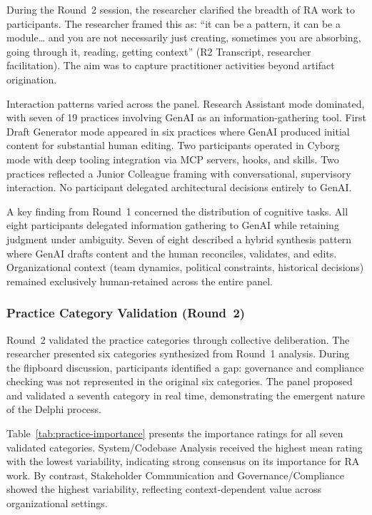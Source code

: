 During the Round~2 session, the researcher clarified the breadth of RA work to
participants. The researcher framed this as: ``it can be a pattern, it can be a
module\ldots{} and you are not necessarily just creating, sometimes you are
absorbing, going through it, reading, getting context'' (R2 Transcript,
researcher facilitation). The aim was to capture practitioner activities beyond artifact origination.

Interaction patterns varied across the panel. Research Assistant mode dominated,
with seven of 19 practices involving GenAI as an information-gathering tool.
First Draft Generator mode appeared in six practices where GenAI produced initial
content for substantial human editing. Two participants operated in Cyborg mode
with deep tooling integration via MCP servers, hooks, and skills. Two practices
reflected a Junior Colleague framing with conversational, supervisory
interaction. No participant delegated architectural decisions entirely to GenAI.

A key finding from Round~1 concerned the distribution of cognitive tasks. All eight
participants delegated information gathering to GenAI while retaining judgment
under ambiguity. Seven of eight described a hybrid synthesis pattern where GenAI
drafts content and the human reconciles, validates, and edits. Organizational
context (team dynamics, political constraints, historical decisions) remained
exclusively human-retained across the entire panel.

\subsubsection{Practice Category Validation (Round~2)}\label{subsubsec:practice-validation}

Round~2 validated the practice categories through collective deliberation. The
researcher presented six categories synthesized from Round~1 analysis. During the
flipboard discussion, participants identified a gap: governance and compliance
checking was not represented in the original six categories. The panel proposed
and validated a seventh category in real time, demonstrating the emergent nature
of the Delphi process.

Table~\ref{tab:practice-importance} presents the importance ratings for all seven
validated categories. System/Codebase Analysis received the highest mean rating
with the lowest variability, indicating strong consensus on its importance for
RA work. By contrast, Stakeholder Communication and Governance/Compliance showed
the highest variability, reflecting context-dependent value across
organizational settings.

